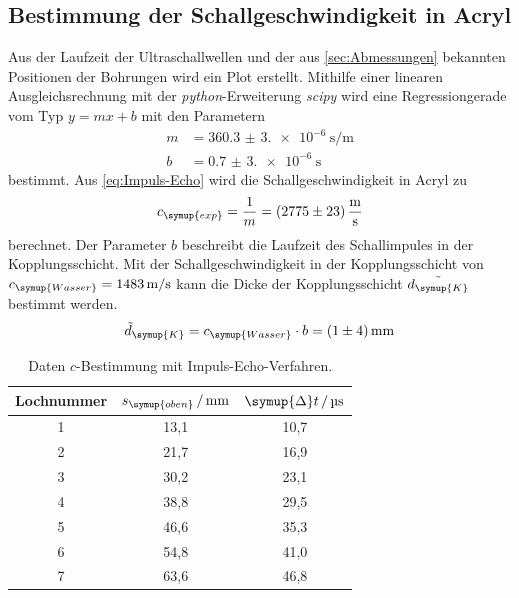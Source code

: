 \subsection{Bestimmung der Schallgeschwindigkeit in Acryl}
Aus der Laufzeit der Ultraschallwellen und der aus \ref{sec:Abmessungen} bekannten Positionen der Bohrungen wird ein Plot erstellt. Mithilfe einer 
linearen Ausgleichsrechnung mit der \textit{python}-Erweiterung \textit{scipy} \cite{scipy} wird eine Regressiongerade vom Typ $y=mx+b$ mit den
Parametern
\begin{align*}
    m &= \qty{360.3(3.0)e-6}{\second\per\metre} \\
    b &= \qty{0.7(3.0)e-6}{\second}
\end{align*}
bestimmt. Aus \eqref{eq:Impuls-Echo} wird die Schallgeschwindigkeit in Acryl zu
\begin{equation*}
    c_{\symup{exp}} = \frac{1}{m} = \qty{2775+-23}{\metre\per\second}
\end{equation*}
berechnet. Der Parameter $b$ beschreibt die Laufzeit des Schallimpules in der Kopplungsschicht. Mit der Schallgeschwindigkeit in der Kopplungsschicht
von $c_{\symup{Wasser}} = \qty{1483}{\metre\per\second}$ \cite{czichos} kann die Dicke der Kopplungsschicht $\tilde{d_{\symup{K}}}$ bestimmt werden.
\begin{equation*}
    \tilde{d}_{\symup{K}} = c_{\symup{Wasser}} \cdot b = \qty{1+-4}{\milli\metre}
\end{equation*}

\begin{table}[H]
    \centering
    \caption{Daten $c$-Bestimmung mit Impuls-Echo-Verfahren.}
    \label{tab:c-bestimmung}
    \begin{tabular}{S[table-format=1.0] S[table-format=2.1] S[table-format=2.1]}
        \toprule
         {Lochnummer} & {$s_{\symup{oben}}\,/\,\unit{\milli\metre}$} & {$\symup{\Delta}t\,/\,\unit{\micro\second}$} \\
        	& 13,1	& 10,7 \\
         2	& 21,7	& 16,9 \\
         3	& 30,2	& 23,1 \\
         4	& 38,8	& 29,5 \\
         5	& 46,6	& 35,3 \\
         6	& 54,8	& 41,0 \\
         7	& 63,6	& 46,8 \\ 
        \bottomrule 
    \end{tabular}
  \end{table}

